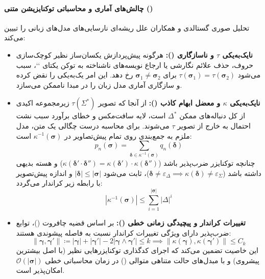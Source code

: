 \paragraph*{چالش‌های آماری و محاسباتی توکنایزیشن متنی ()}
تحلیل صوری گستالدی و همکاران \cite{gastaldi2025foundations} علل ریشه‌ای نارسایی‌های مدل‌های زبانی را تبیین می‌کند:
\begin{itemize}
    \item \textbf{نایک‌به‌یکی $\tau$ و ناسازگاری ():} هرگونه پیش‌پردازش یکسان‌ساز نظیر کوچک‌سازی حروف، حذف علائم نگارشی یا ارجاع نویسه‌های ناشناخته به توکن یکتای `\en{[UNK]}`، سبب می‌شود $\tau(\boldsymbol{\sigma}_1) = \tau(\boldsymbol{\sigma}_2)$ برای $\boldsymbol{\sigma}_1 \neq \boldsymbol{\sigma}_2$ رخ دهد. این امر یک‌به‌یکی را نقض کرده و سازگاری آماری مدل زبان را در مبدا ناممکن می‌سازد.
    \item \textbf{نایک‌به‌یکی $\kappa$ و معضل ابهام کاذب ():} از آنجا که تصویر $\tau(\Sigma^*)$ زیرمجموعه اکیدی از کل دنباله‌های ممکن $\Delta^*$ است، لایه سافت‌مکس و خطای برآورد سبب نشت احتمال به خارج از تصویر $\tau$ می‌شوند. برای محاسبه درست چگالی یک متن، مدل ملزم به جمع‌بندی روی تمام پیش‌تصاویر در $\kappa^{-1}(\boldsymbol{\sigma})$ است:
    \begin{equation}
        p_n(\boldsymbol{\sigma}) = \sum_{\boldsymbol{\delta} \in \kappa^{-1}(\boldsymbol{\sigma})} q_n(\boldsymbol{\delta})
    \end{equation}
    چنانچه توکنایزر ضرب‌پذیر باشد ($\kappa(\boldsymbol{\delta}' \cdot \boldsymbol{\delta}'') = \kappa(\boldsymbol{\delta}') \cdot \kappa(\boldsymbol{\delta}'')$) و هسته بدیهی داشته باشد ($\boldsymbol{\delta} \neq \varepsilon_\Delta \implies \kappa(\boldsymbol{\delta}) \neq \varepsilon_\Sigma$)، ثابت می‌شود $|\boldsymbol{\delta}| \le |\boldsymbol{\sigma}|$ و اندازه پیش‌تصویر با رابطه زیر کراندار می‌گردد:
    \begin{equation}
        |\kappa^{-1}(\boldsymbol{\sigma})| \le \sum_{i=1}^{|\boldsymbol{\sigma}|} |\Delta|^i
    \end{equation}
    \item \textbf{تغییرات کراندار و پیچیدگی زمانی خطی ():} بر اساس قضیه چافروت ()، توابع ضرب‌پذیر دارای ویژگی تغییرات کراندار نسبت به فاصله پیشوندی هستند:
    \begin{equation}
        \|\boldsymbol{\gamma}, \boldsymbol{\gamma}'\| \coloneqq |\boldsymbol{\gamma}| + |\boldsymbol{\gamma}'| - 2 |\boldsymbol{\gamma} \wedge \boldsymbol{\gamma}'| \le k \implies \|\kappa(\boldsymbol{\gamma}), \kappa(\boldsymbol{\gamma}')\| \le C_k
    \end{equation}
    این خاصیت تضمین می‌کند که اجرای کدگذاری توکنایزرهایی نظیر  (با اصل بیشترین پیشروی) و  با مبدل‌های حالت متناهی متوالی () در زمان محاسباتی خطی $\mathcal{O}(|\boldsymbol{\sigma}|)$ امکان‌پذیر است.
\end{itemize}

